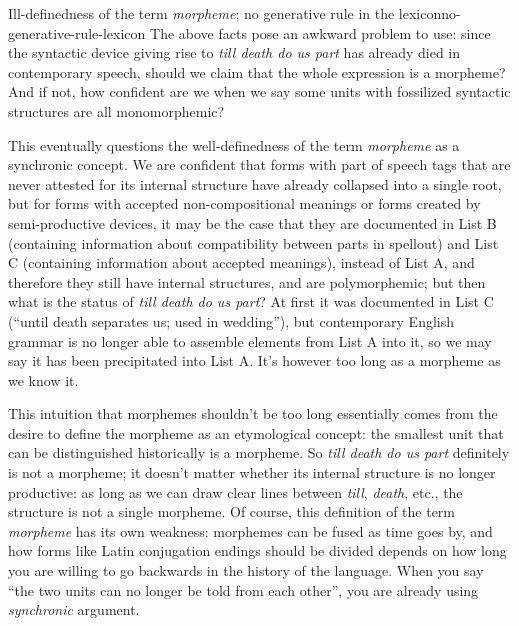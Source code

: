 \documentclass[UTF8, a4paper, oneside, scheme=plain, 12pt]{ctexrep}
\newcommand*{\term}[1]{\emph{#1}}
\newcommand{\form}[1]{\emph{#1}}
\begin{document}
\begin{theorybox}{Ill-definedness of the term \term{morpheme}; no generative rule in the lexicon}{no-generative-rule-lexicon}
    The above facts pose an awkward problem to use: 
    since the syntactic device giving rise to \form{till death do us part}
    has already died in contemporary speech, 
    should we claim that the whole expression is a morpheme?
    And if not, how confident are we 
    when we say some units with fossilized syntactic structures 
    are all monomorphemic?

    This eventually questions the well-definedness of the term \term{morpheme}
    as a synchronic concept.
    We are confident that 
    forms with part of speech tags that are never attested for its internal structure 
    have already collapsed into a single root, 
    but for forms with accepted non-compositional meanings
    or forms created by semi-productive devices,
    it may be the case that 
    they are documented in List B (containing information about compatibility between parts in spellout) 
    and List C (containing information about accepted meanings),
    instead of List A,
    and therefore they still have internal structures,
    and are polymorphemic;
    but then what is the status of \form{till death do us part}?
    At first it was documented in List C 
    (``until death separates us; used in wedding''),
    but contemporary English grammar 
    is no longer able to assemble elements from List A into it,
    so we may say it has been precipitated into List A.
    It's however too long as a morpheme as we know it.

    This intuition that morphemes shouldn't be too long 
    essentially comes from the desire to define the morpheme
    as an etymological concept:
    the smallest unit that can be distinguished historically
    is a morpheme.
    So \form{till death do us part} definitely is not a morpheme;
    it doesn't matter whether its internal structure 
    is no longer productive:
    as long as we can draw clear lines between \form{till}, \form{death}, etc., 
    the structure is not a single morpheme.
    Of course, this definition of the term \term{morpheme}
    has its own weakness: 
    morphemes can be fused as time goes by, 
    and how forms like Latin conjugation endings should be divided 
    depends on how long you are willing to go backwards 
    in the history of the language.
    When you say ``the two units can no longer be told from each other'',
    you are already using \emph{synchronic} argument. 
    

\end{theorybox}
\end{document}
